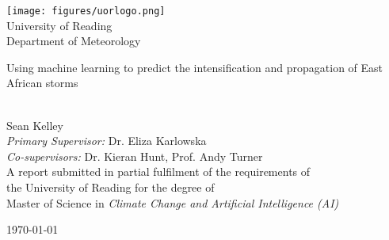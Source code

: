 \documentclass[a4paper,11pt,oneside]{book}
\begin{document}
    
    \frontmatter
    
    \begin{titlepage}      
        \begin{center}
            \texttt{[image: figures/uorlogo.png]}\\[0.5cm]
            {\LARGE University of Reading\\[0.5cm]
            Department of Meteorology}\\[2cm]
			
            \linespread{1.2}\huge {
                Using machine learning to predict the intensification and propagation of East African storms
            
            }
            \linespread{1}~\\[2cm]
            {\Large
                Sean Kelley
            }\\[1cm] 
            
            {\large           
                \emph{Primary Supervisor:} Dr. Eliza Karlowska\\
                \emph{Co-supervisors:} Dr. Kieran Hunt, Prof. Andy Turner 
            }\\[1cm]
            
            \large A report submitted in partial fulfilment of the requirements of\\the University of Reading for the degree of\\
            Master of Science in \textit{Climate Change and Artificial Intelligence (AI)}\\[0.3cm] 
            \vfill
            
            \today %
        \end{center}
    \end{titlepage}
    
    
    
    

    

    \tableofcontents
    \listoffigures
    \listoftables

    
    \printnomenclature
    \newpage

    
    \printglossary
    \printglossary[type=\acronymtype]
    \newpage

    \mainmatter
    
    
    
    
    
    
    

    
    
    \begin{appendices}
        
    \end{appendices}
    
\end{document}
